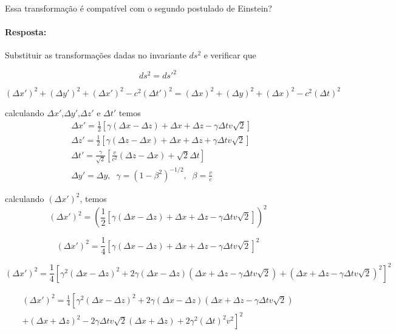 \documentclass[10pt,a4paper]{article}
\begin{document}
	Essa transformação é compatível com o segundo postulado de Einstein? 
	
	\paragraph{Resposta:} Substituir as transformações dadas no invariante $ds^2$ e verificar que 
	
	\begin{equation*}
	 ds^2 = ds'^2
	\end{equation*}

$$(\Delta x')^2+(\Delta y')^2+(\Delta x')^2-c^2(\Delta t')^2 = (\Delta x)^2+(\Delta y)^2+(\Delta x)^2-c^2(\Delta t)^2$$

calculando $\Delta x'$,$\Delta y'$,$\Delta z'$ e $\Delta t'$ temos
	\begin{align*}
	&\Delta x' = \frac{1}{2}\left[\gamma(\Delta x- \Delta z)+ \Delta x+ \Delta z-\gamma\Delta tv\sqrt{2}\right] \\
	& \Delta z'=\frac{1}{2}\left[\gamma(\Delta z- \Delta x)+\Delta x+\Delta z+\gamma \Delta tv\sqrt{2}\right]\\
	&\Delta t'=\frac{\gamma}{\sqrt{2}}\left[\frac{v}{c^2}(\Delta z-\Delta x)+\sqrt{2}\Delta t\right] \\
	&\Delta y'=\Delta y, \;\; \gamma = (1-\beta^2)^{-1/2}, \;\; \beta = \frac{v}{c}
\end{align*}

calculando $(\Delta x')^2$, temos
$$(\Delta x')^2 = (\frac{1}{2}\left[\gamma(\Delta x- \Delta z)+ \Delta x+ \Delta z-\gamma\Delta tv\sqrt{2}\right])^2$$

$$(\Delta x')^2 = \frac{1}{4}\left[\gamma(\Delta x- \Delta z)+ \Delta x+ \Delta z-\gamma\Delta tv\sqrt{2}\right]^2$$

$$(\Delta x')^2 = \frac{1}{4}\left[\gamma^2(\Delta x- \Delta z)^2+ 2\gamma(\Delta x- \Delta z)(\Delta x+ \Delta z-\gamma\Delta tv\sqrt{2}) + (\Delta x+ \Delta z-\gamma\Delta tv\sqrt{2})^2\right]^2$$

\begin{equation}\nonumber
	\begin{split}
	(\Delta x')^2 = \frac{1}{4}\left[\gamma^2(\Delta x- \Delta z)^2+ 2\gamma(\Delta x- \Delta z)(\Delta x+ \Delta z-\gamma\Delta tv\sqrt{2}) \right.\\
	\left.+ (\Delta x+ \Delta z)^2-2\gamma\Delta tv\sqrt{2}(\Delta x+ \Delta z)+2\gamma^2(\Delta t)^2v^2\right]^2
\end{split}
\end{equation}
\end{document}
